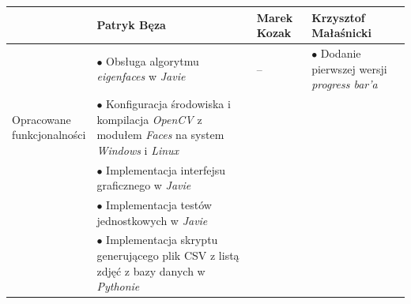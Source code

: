 \documentclass[a4paper,titlepage]{article}
\theoremstyle{break}
\numberwithin{equation}{subsection}
\begin{document}
\begin{appendices}
\begin{table}[H]
\center
\begin{tabular}{p{2.5cm}|p{4cm}|p{4cm}|p{4cm}}
& Patryk Bęza & Marek Kozak & Krzysztof Małaśnicki \\\hline\hline
\multirow{3}{*}{\parbox{3cm}{\ \\Opracowane \\funkcjonalności}} & $\bullet$ Obsługa algorytmu \emph{eigenfaces} w \emph{Javie} & -- & $\bullet$ Dodanie pierwszej wersji \emph{progress bar'a}\\
& $\bullet$ Konfiguracja środowiska i kompilacja \emph{OpenCV} z modułem \emph{Faces} na system \emph{Windows} i \emph{Linux} & &\\
& $\bullet$ Implementacja interfejsu graficznego w \emph{Javie} & &\\
& $\bullet$ Implementacja testów jednostkowych w \emph{Javie} & &\\
& $\bullet$ Implementacja skryptu generującego plik CSV z listą zdjęć z bazy danych w \emph{Pythonie} & &\\
\end{tabular}
\end{table}

\end{appendices}


\clearpage
\printbibliography[title=Bibliografia]
\end{document}
